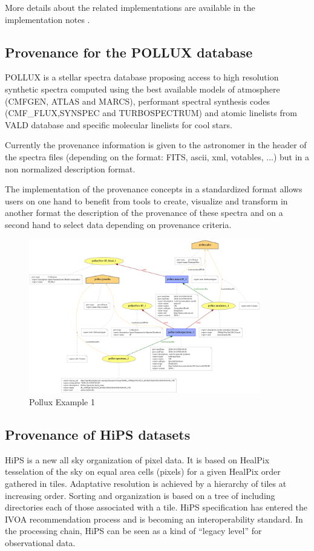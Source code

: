 More details about the related implementations are available in the implementation notes \citep{std:ProvenanceImplementationNote}.


\subsection{Provenance for the POLLUX database}

POLLUX is a stellar spectra database proposing access to high resolution synthetic spectra computed using the best available models of atmosphere (CMFGEN, ATLAS and MARCS), performant spectral synthesis codes (CMF\_FLUX,SYNSPEC and TURBOSPECTRUM) and atomic linelists from VALD database and specific molecular linelists for cool stars. 

Currently the provenance information is given to the astronomer in the header of the spectra files (depending on the format: FITS, ascii, xml, votables, ...) but in a non normalized description format. 

The implementation of the provenance concepts in a standardized format allows users on one hand to benefit from tools to create, visualize and transform in another format the description of the provenance of these spectra and on a second hand to select data depending on provenance criteria.

\begin{figure}
\centering
\includegraphics[width=0.9\textwidth]{usecase_Pollux_example1.png}
\caption{Pollux Example 1}
\label{fig:pollux}
\end{figure}

\subsection{Provenance of HiPS datasets}
HiPS is a new all sky organization of pixel data. It is based on HealPix tesselation of the sky on equal area cells (pixels) for a given HealPix order gathered in tiles. Adaptative resolution is achieved by a hierarchy of tiles at increasing order. Sorting and organization is based on a tree of including directories each of those associated with a tile. HiPS specification has entered the IVOA recommendation process and is becoming an interoperability standard.
In the processing chain, HiPS can be seen as a kind of ``legacy level'' for observational data.


